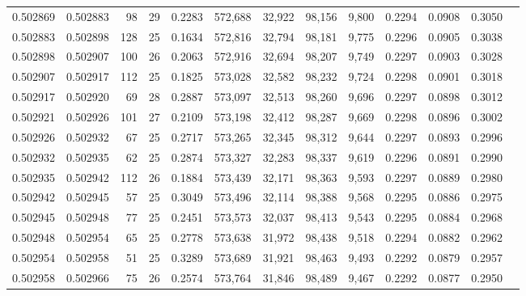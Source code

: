 \begin{tabular}{rrrrrrrrrrrrr}
0.502869 & 0.502883 &  98 &  29 &                                     0.2283 & 572,688 &  32,922 &  98,156 &   9,800 & 0.2294 & 0.0908 & 0.3050 \\
0.502883 & 0.502898 & 128 &  25 &                                     0.1634 & 572,816 &  32,794 &  98,181 &   9,775 & 0.2296 & 0.0905 & 0.3038 \\
0.502898 & 0.502907 & 100 &  26 &                                     0.2063 & 572,916 &  32,694 &  98,207 &   9,749 & 0.2297 & 0.0903 & 0.3028 \\
0.502907 & 0.502917 & 112 &  25 &                                     0.1825 & 573,028 &  32,582 &  98,232 &   9,724 & 0.2298 & 0.0901 & 0.3018 \\
0.502917 & 0.502920 &  69 &  28 &                                     0.2887 & 573,097 &  32,513 &  98,260 &   9,696 & 0.2297 & 0.0898 & 0.3012 \\
0.502921 & 0.502926 & 101 &  27 &                                     0.2109 & 573,198 &  32,412 &  98,287 &   9,669 & 0.2298 & 0.0896 & 0.3002 \\
0.502926 & 0.502932 &  67 &  25 &                                     0.2717 & 573,265 &  32,345 &  98,312 &   9,644 & 0.2297 & 0.0893 & 0.2996 \\
0.502932 & 0.502935 &  62 &  25 &                                     0.2874 & 573,327 &  32,283 &  98,337 &   9,619 & 0.2296 & 0.0891 & 0.2990 \\
0.502935 & 0.502942 & 112 &  26 &                                     0.1884 & 573,439 &  32,171 &  98,363 &   9,593 & 0.2297 & 0.0889 & 0.2980 \\
0.502942 & 0.502945 &  57 &  25 &                                     0.3049 & 573,496 &  32,114 &  98,388 &   9,568 & 0.2295 & 0.0886 & 0.2975 \\
0.502945 & 0.502948 &  77 &  25 &                                     0.2451 & 573,573 &  32,037 &  98,413 &   9,543 & 0.2295 & 0.0884 & 0.2968 \\
0.502948 & 0.502954 &  65 &  25 &                                     0.2778 & 573,638 &  31,972 &  98,438 &   9,518 & 0.2294 & 0.0882 & 0.2962 \\
0.502954 & 0.502958 &  51 &  25 &                                     0.3289 & 573,689 &  31,921 &  98,463 &   9,493 & 0.2292 & 0.0879 & 0.2957 \\
0.502958 & 0.502966 &  75 &  26 &                                     0.2574 & 573,764 &  31,846 &  98,489 &   9,467 & 0.2292 & 0.0877 & 0.2950 \\

\end{tabular}
